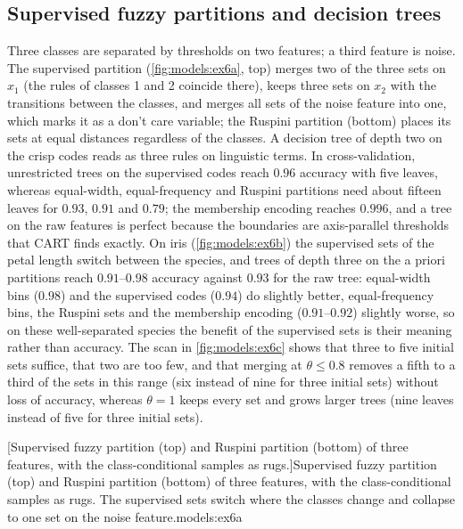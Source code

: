 \subsection{Supervised fuzzy partitions and decision trees}

Three classes are separated by thresholds on two features; a third feature is noise. The supervised partition (\cref{fig:models:ex6a}, top) merges two of the three sets on $x_1$ (the rules of classes 1 and 2 coincide there), keeps three sets on $x_2$ with the transitions between the classes, and merges all sets of the noise feature into one, which marks it as a don't care variable; the Ruspini partition (bottom) places its sets at equal distances regardless of the classes. A decision tree of depth two on the crisp codes reads as three rules on linguistic terms. In cross-validation, unrestricted trees on the supervised codes reach $0.96$ accuracy with five leaves, whereas equal-width, equal-frequency and Ruspini partitions need about fifteen leaves for $0.93$, $0.91$ and $0.79$; the membership encoding reaches $0.996$, and a tree on the raw features is perfect because the boundaries are axis-parallel thresholds that CART finds exactly. On iris (\cref{fig:models:ex6b}) the supervised sets of the petal length switch between the species, and trees of depth three on the a priori partitions reach $0.91$--$0.98$ accuracy against $0.93$ for the raw tree: equal-width bins ($0.98$) and the supervised codes ($0.94$) do slightly better, equal-frequency bins, the Ruspini sets and the membership encoding ($0.91$--$0.92$) slightly worse, so on these well-separated species the benefit of the supervised sets is their meaning rather than accuracy. The scan in \cref{fig:models:ex6c} shows that three to five initial sets suffice, that two are too few, and that merging at $\theta\le0.8$ removes a fifth to a third of the sets in this range (six instead of nine for three initial sets) without loss of accuracy, whereas $\theta=1$ keeps every set and grows larger trees (nine leaves instead of five for three initial sets).

[Supervised fuzzy partition (top) and Ruspini partition (bottom) of three features, with the class-conditional samples as rugs.]{Supervised fuzzy partition (top) and Ruspini partition (bottom) of three features, with the class-conditional samples as rugs. The supervised sets switch where the classes change and collapse to one set on the noise feature.}{models:ex6a}

